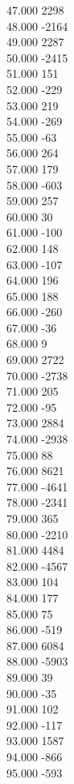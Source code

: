 { 47.000	2298 \\
 48.000	-2164 \\
 49.000	2287 \\
 50.000	-2415 \\
 51.000	151 \\
 52.000	-229 \\
 53.000	219 \\
 54.000	-269 \\
 55.000	-63 \\
 56.000	264 \\
 57.000	179 \\
 58.000	-603 \\
 59.000	257 \\
 60.000	30 \\
 61.000	-100 \\
 62.000	148 \\
 63.000	-107 \\
 64.000	196 \\
 65.000	188 \\
 66.000	-260 \\
 67.000	-36 \\
 68.000	9 \\
 69.000	2722 \\
 70.000	-2738 \\
 71.000	205 \\
 72.000	-95 \\
 73.000	2884 \\
 74.000	-2938 \\
 75.000	88 \\
 76.000	8621 \\
 77.000	-4641 \\
 78.000	-2341 \\
 79.000	365 \\
 80.000	-2210 \\
 81.000	4484 \\
 82.000	-4567 \\
 83.000	104 \\
 84.000	177 \\
 85.000	75 \\
 86.000	-519 \\
 87.000	6084 \\
 88.000	-5903 \\
 89.000	39 \\
 90.000	-35 \\
 91.000	102 \\
 92.000	-117 \\
 93.000	1587 \\
 94.000	-866 \\
 95.000	-593 \\
}
